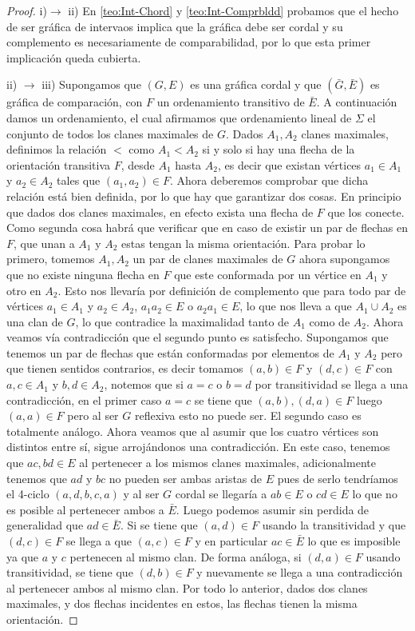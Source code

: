 \begin{proof}
    i)$\to$ ii) En \cref{teo:Int-Chord} y \cref{teo:Int-Comprbldd} probamos que el hecho de ser gráfica de intervaos implica que la gráfica debe ser cordal y su complemento es necesariamente de comparabilidad, por lo que esta primer implicación queda cubierta.
    
    ii) $\to$ iii) Supongamos que $(G,E)$ es una gráfica cordal y que $(\bar{G}, \bar{E})$ es gráfica de comparación, con $F$ un ordenamiento transitivo de $\bar{E}$. A continuación damos un ordenamiento, el cual afirmamos que ordenamiento lineal de $\Sigma$ el conjunto de todos los clanes maximales de $G$. Dados  $A_1, A_2$ clanes maximales, definimos la relación $<$ como $A_1 < A_2$ si y solo si hay una flecha de la orientación transitiva $F$, desde $A_1$ hasta $A_2$, es decir que existan vértices $a_1 \in A_1$ y $a_2 \in A_2$ tales que $(a_1,a_2)\in F$. 
    Ahora deberemos comprobar que dicha relación está bien definida, por lo que hay que garantizar dos cosas. En principio que dados dos clanes maximales, en efecto exista una flecha de $F$ que los conecte. Como segunda cosa habrá que verificar que en caso de existir un par de flechas en $F$, que unan a $A_1$ y $A_2$ estas tengan la misma orientación. Para probar lo primero, tomemos $A_1,A_2$ un par de clanes maximales de $G$ ahora supongamos que no existe ninguna flecha en $F$ que este conformada por un vértice en $A_1$ y otro en $A_2$. Esto nos llevaría por definición de complemento que para todo par de vértices $a_1\in A_1$ y $a_2 \in A_2$,  $a_1a_2\in E$ o $a_2a_1\in E$, lo que nos lleva a que $A_1 \cup A_2$ es una clan de $G$, lo que contradice la maximalidad tanto de $A_1$ como de $A_2$. Ahora veamos vía contradicción que el segundo punto es satisfecho. Supongamos que tenemos un par de flechas que están conformadas por elementos de $A_1$ y $A_2$ pero que tienen sentidos contrarios, es decir tomamos $(a,b)\in F$ y $(d,c)\in F$ con $a,c \in A_1$ y $b,d\in A_2$, notemos que si $a=c $ o $b=d$ por transitividad se llega a una contradicción, en el primer caso $a=c$ se tiene que $(a,b), (d,a)\in F$ luego $(a,a)\in F$ pero al ser $G$ reflexiva esto no puede ser. El segundo caso es totalmente análogo. Ahora veamos que al asumir que los cuatro vértices son distintos entre sí, sigue arrojándonos una contradicción. En este caso, tenemos que $ac, bd\in E$ al pertenecer a los mismos clanes maximales, adicionalmente tenemos que $ad$ y $bc$ no pueden ser ambas aristas de $E$ pues de serlo tendríamos el 4-ciclo $(a,d,b,c,a)$ y al ser $G$ cordal se llegaría a $ab\in E$ o $cd\in E$ lo que no es posible al pertenecer ambos a $\bar{E}$. Luego podemos asumir sin perdida de generalidad que $ad \in \bar{E}$. Si se tiene que $(a,d)\in F$ usando la transitividad y que $(d,c)\in F$ se llega a que $(a,c)\in F$ y en particular $ac\in \bar{E}$ lo que es imposible ya que $a$ y $c$ pertenecen al mismo clan. De forma análoga, si $(d,a)\in F$ usando transitividad, se tiene que $(d,b)\in F$ y nuevamente se llega a una contradicción al pertenecer ambos al mismo clan. Por todo lo anterior, dados dos clanes maximales, y dos flechas incidentes en estos, las flechas tienen la misma orientación. 

\end{proof}
